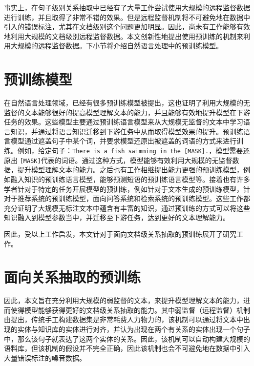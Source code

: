 事实上，在句子级别关系抽取中已经有了大量工作尝试使用大规模的远程监督数据进行训练，并且取得了非常不错的效果\cite{lin2016neural,zeng2015distant}。但是远程监督机制将不可避免地在数据中引入的错误标注，尤其在文档级别这个问题更加明显。因此，尚未有工作能够有效地利用大规模的文档级别远程监督数据。本文创新性地提出使用预训练的机制来利用大规模的远程监督数据。下小节将介绍自然语言处理中的预训练模型。

\section{预训练模型}
在自然语言处理领域，已经有很多预训练模型\cite{devlin2019bert,yang2019xlnet,joshi2020spanbert}被提出，这也证明了利用大规模的无监督的文本能够很好的提高模型理解文本的能力，并且能够有效地提升模型在下游任务的效果。这些模型主要通过预训练语言模型来从大规模无监督的文本中学习语言知识，并通过将语言知识迁移到下游任务中从而取得模型效果的提升。预训练语言模型通过遮盖句子中某个词，并要求模型还原出被遮盖的词语的方式来进行训练。例如，给定句子：\texttt{There is a fish swimming in the [MASK].}，模型需要还原出 \texttt{[MASK]}代表的词语。通过这种方式，模型能够有效利用大规模的无监督数据，提升模型理解文本的能力。之后也有工作相继提出能力更强的预训练模型，例如融入知识的预训练语言模型\cite{zhang2019ernie}，能够预测短语的预训练语言模型\cite{joshi2020spanbert}等。接着也有许多学者针对于特定的任务开展模型的预训练，例如针对于文本生成的预训练模型\cite{lewis2019bart,song2019mass,dong2019unified}，针对于推荐系统的预训练模型\cite{yuan2020parameter}，面向问答系统和检索系统的预训练模型\cite{guu2020realm}。这些工作都充分证明了大规模无标注文本中蕴含有丰富的知识，通过预训练的方式可以将这些知识融入到模型参数当中，并迁移至下游任务，达到更好的文本理解能力。

因此，受以上工作启发，本文针对于面向文档级关系抽取的预训练展开了研究工作。




\section{面向关系抽取的预训练}

因此，本文旨在充分利用大规模的弱监督的文本，来提升模型理解文本的能力，进而使得模型能够获得更好的文档级关系抽取的能力。其中弱监督（远程监督）机制由\citet{mintz2009distant}提出，传统手工构建数据集是非常耗费人力物力的，该机制可以通过将文本中出现的实体与知识库的实体进行对齐，并认为出现在两个有关系的实体出现一个句子中，那么该句子就表达了这两个实体的关系。因此，该机制可以自动构建大规模的语料库，但该机制的假设并不完全正确，因此该机制也会不可避免地在数据中引入大量错误标注的噪音数据。

